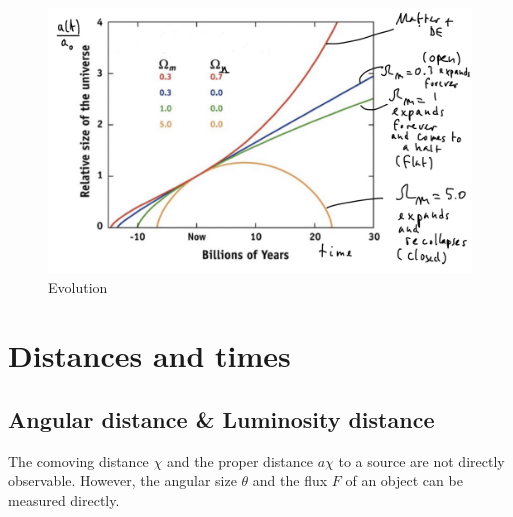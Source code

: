 \begin{figure}
	\centering
	\includegraphics[width=\textwidth]{img/ch-02/evolution.png}
	\caption{Evolution}
	\label{fig:evolution}
\end{figure}




\section{Distances and times}



\subsection{Angular distance \& Luminosity distance}

The comoving distance $\chi$ and the proper distance $a \chi$ to a source are not directly observable. However, the angular size $\theta$ and the flux $F$ of an object can be measured directly.

